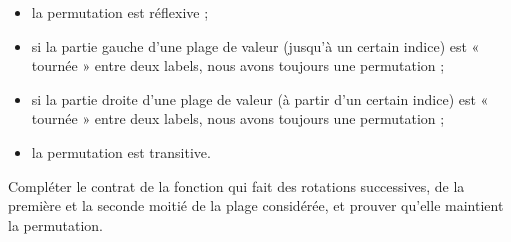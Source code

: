 \begin{itemize}
\item la permutation est réflexive ;
\item si la partie gauche d'une plage de valeur (jusqu'à un certain indice) est
      « tournée » entre deux labels, nous avons toujours une permutation ;
\item si la partie droite d'une plage de valeur (à partir d'un certain indice)
      est « tournée » entre deux labels, nous avons toujours une permutation ;
\item la permutation est transitive.
\end{itemize}




Compléter le contrat de la fonction  qui fait des
rotations successives, de la première et la seconde moitié de la plage
considérée, et prouver qu'elle maintient la permutation.



